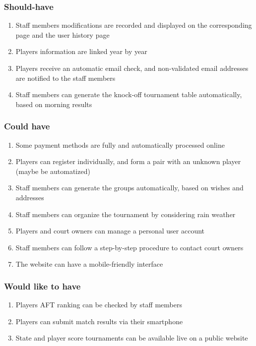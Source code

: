 \subsubsection{Should-have}

\begin{enumerate}
    \item Staff members modifications are recorded and displayed on the
        corresponding page and the user history page
    \item Players information are linked year by year
    \item Players receive an automatic email check, and non-validated
        email addresses are notified to the staff members
    \item Staff members can generate the knock-off tournament table
        automatically, based on morning results
\end{enumerate}

\subsubsection{Could have}

\begin{enumerate}
    \item Some payment methods are fully and automatically processed
        online
    \item Players can register individually, and form a pair with an
        unknown player (maybe be automatized)
    \item Staff members can generate the groups automatically, based on
        wishes and addresses
    \item Staff members can organize the tournament by considering rain
        weather
    \item Players and court owners can manage a personal user
        account
    \item Staff members can follow a step-by-step procedure to contact
        court owners
    \item The website can have a mobile-friendly interface
\end{enumerate}

\subsubsection{Would like to have}

\begin{enumerate}
    \item Players AFT ranking can be checked by staff members
    \item Players can submit match results via their smartphone
    \item State and player score tournaments can be available live on a
        public website
\end{enumerate}


